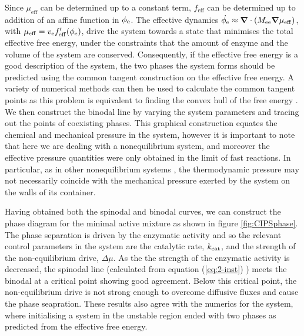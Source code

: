 Since $\mu_\mathrm{eff}$ can be determined up to a constant term, $f_\mathrm{eff}$ can be determined up to addition of an affine function in $\phi_{\mathrm{e}}$. The effective dynamics $\dot{\phi_{\mathrm{e}}}\approx \bm{\nabla} \cdot (M_{\mathrm{ee}}\bm{\nabla}\mu_\mathrm{eff})$, with $\mu_\mathrm{eff}=v_{\mathrm{e}} f'_\mathrm{eff}(\phi_{\mathrm{e}})$, drive the system towards a state that minimises the total effective free energy, under the constraints that the amount of enzyme and the volume of the system are conserved. Consequently, if the effective free energy is a good description of the system, the two phases the system forms should be predicted using the common tangent construction on the effective free energy. A variety of numerical methods can then be used to calculate the common tangent points as this problem is equivalent to finding the convex hull of the free energy \cite{wolff_thermodynamic_2011, doi_soft_2013}. We then construct the binodal line by varying the system parameters and tracing out the points of coexisting phases. This graphical construction equates the chemical and mechanical pressure in the system, however it is important to note that here we are dealing with a nonequilibrium system, and moreover the effective pressure quantities were only obtained in the limit of fast reactions. In particular, as in other nonequilibrium systems \cite{wittkowski_scalar_2014}, the thermodynamic pressure may not necessarily coincide with the mechanical pressure exerted by the system on the walls of its container.

Having obtained both the spinodal and binodal curves, we can construct the phase diagram for the minimal active mixture as shown in figure \ref{fig:CIPSphase}. The phase separation is driven by the enzymatic activity and so the relevant control parameters in the system are the catalytic rate, $k_{\mathrm{cat}}$, and the strength of the non-equilibrium drive, $\Delta\mu$. As the the strength of the enzymatic activity is decreased, the spinodal line (calculated from equation (\ref{eq:2-inst}) ) meets the binodal at a critical point showing good agreement. Below this critical point, the non-equilibrium drive is not strong enough to overcome diffusive fluxes and cause the phase seapration. These results also agree with the numerics for the system, where initialising a system in the unstable region ended with two phases as predicted from the effective free energy.

